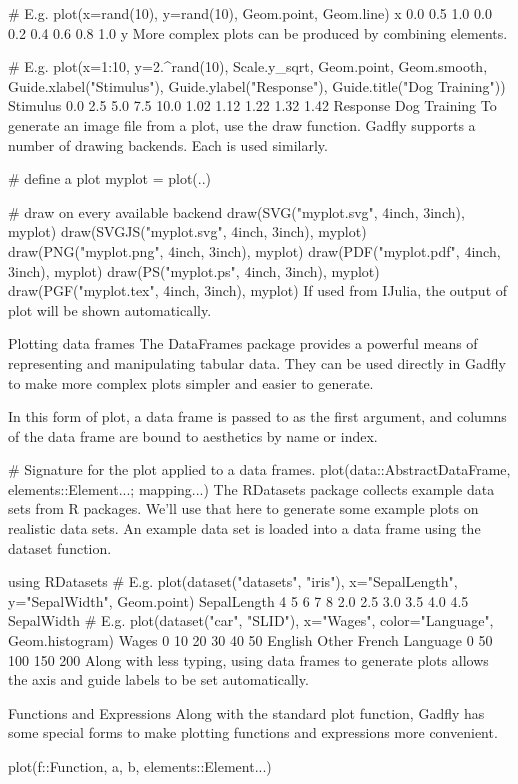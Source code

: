 # E.g.
plot(x=rand(10), y=rand(10), Geom.point, Geom.line)
x
0.0
0.5
1.0
0.0
0.2
0.4
0.6
0.8
1.0
y
More complex plots can be produced by combining elements.

# E.g.
plot(x=1:10, y=2.^rand(10),
     Scale.y_sqrt, Geom.point, Geom.smooth,
     Guide.xlabel("Stimulus"), Guide.ylabel("Response"), Guide.title("Dog Training"))
Stimulus
0.0
2.5
5.0
7.5
10.0
1.02
1.12
1.22
1.32
1.42
Response
Dog Training
To generate an image file from a plot, use the draw function. Gadfly supports a number of drawing backends. Each is used similarly.

# define a plot
myplot = plot(..)

# draw on every available backend
draw(SVG("myplot.svg", 4inch, 3inch), myplot)
draw(SVGJS("myplot.svg", 4inch, 3inch), myplot)
draw(PNG("myplot.png", 4inch, 3inch), myplot)
draw(PDF("myplot.pdf", 4inch, 3inch), myplot)
draw(PS("myplot.ps", 4inch, 3inch), myplot)
draw(PGF("myplot.tex", 4inch, 3inch), myplot)
If used from IJulia, the output of plot will be shown automatically.

Plotting data frames
The DataFrames package provides a powerful means of representing and manipulating tabular data. They can be used directly in Gadfly to make more complex plots simpler and easier to generate.

In this form of plot, a data frame is passed to as the first argument, and columns of the data frame are bound to aesthetics by name or index.

# Signature for the plot applied to a data frames.
plot(data::AbstractDataFrame, elements::Element...; mapping...)
The RDatasets package collects example data sets from R packages. We'll use that here to generate some example plots on realistic data sets. An example data set is loaded into a data frame using the dataset function.

using RDatasets
# E.g.
plot(dataset("datasets", "iris"), x="SepalLength", y="SepalWidth", Geom.point)
SepalLength
4
5
6
7
8
2.0
2.5
3.0
3.5
4.0
4.5
SepalWidth
 # E.g.
plot(dataset("car", "SLID"), x="Wages", color="Language", Geom.histogram)
Wages
0
10
20
30
40
50
English
Other
French
Language
0
50
100
150
200
Along with less typing, using data frames to generate plots allows the axis and guide labels to be set automatically.

Functions and Expressions
Along with the standard plot function, Gadfly has some special forms to make plotting functions and expressions more convenient.

plot(f::Function, a, b, elements::Element...)

